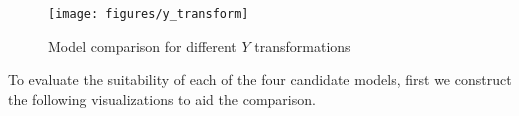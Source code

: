 \documentclass [11pt, proquest] {uwthesis}[2015/03/03]
\begin{document}

\begin{figure}
   \texttt{[image: figures/y\_transform]} 
  \caption{Model comparison for different $Y$ transformations}
  \label{fig:y_transform}
\end{figure}


To evaluate the suitability of each of the four candidate models, first we construct the following visualizations to aid the comparison.
\end{document}
